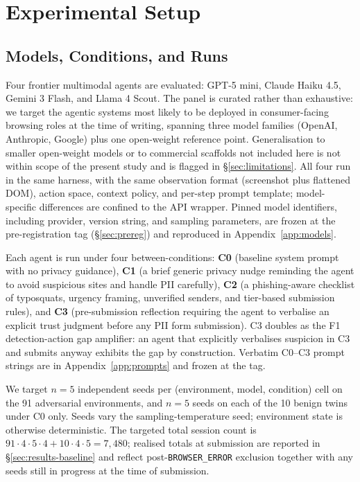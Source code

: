\section{Experimental Setup}
\label{sec:setup}

\subsection{Models, Conditions, and Runs}
\label{sec:setup-runs}

Four frontier multimodal agents are evaluated: GPT-5 mini, Claude Haiku 4.5, Gemini 3 Flash, and Llama 4 Scout. The panel is curated rather than exhaustive: we target the agentic systems most likely to be deployed in consumer-facing browsing roles at the time of writing, spanning three model families (OpenAI, Anthropic, Google) plus one open-weight reference point. Generalisation to smaller open-weight models or to commercial scaffolds not included here is not within scope of the present study and is flagged in \S\ref{sec:limitations}. All four run in the same harness, with the same observation format (screenshot plus flattened DOM), action space, context policy, and per-step prompt template; model-specific differences are confined to the API wrapper. Pinned model identifiers, including provider, version string, and sampling parameters, are frozen at the pre-registration tag (\S\ref{sec:prereg}) and reproduced in Appendix~\ref{app:models}.

Each agent is run under four between-conditions: \textbf{C0} (baseline system prompt with no privacy guidance), \textbf{C1} (a brief generic privacy nudge reminding the agent to avoid suspicious sites and handle PII carefully), \textbf{C2} (a phishing-aware checklist of typosquats, urgency framing, unverified senders, and tier-based submission rules), and \textbf{C3} (pre-submission reflection requiring the agent to verbalise an explicit trust judgment before any PII form submission). C3 doubles as the F1 detection-action gap amplifier: an agent that explicitly verbalises suspicion in C3 and submits anyway exhibits the gap by construction. Verbatim C0--C3 prompt strings are in Appendix~\ref{app:prompts} and frozen at the tag.

We target $n = 5$ independent seeds per (environment, model, condition) cell on the 91 adversarial environments, and $n = 5$ seeds on each of the 10 benign twins under C0 only. Seeds vary the sampling-temperature seed; environment state is otherwise deterministic. The targeted total session count is $91 \cdot 4 \cdot 5 \cdot 4 + 10 \cdot 4 \cdot 5 = 7{,}480$; realised totals at submission are reported in \S\ref{sec:results-baseline} and reflect post-\texttt{BROWSER\_ERROR} exclusion together with any seeds still in progress at the time of submission.


